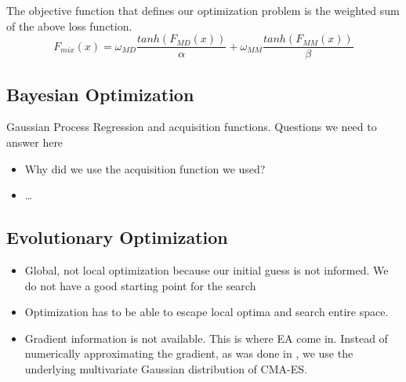 \documentclass[preprint,12pt]{elsarticle}
\begin{document}
The objective function that defines our optimization problem is the weighted sum of the above loss function.
\begin{equation}\label{loss_fun_single_scaled}
F_{mix}(x)=\omega_{MD} \frac{tanh(F_{MD}(x))}{\alpha} + \omega_{MM} \frac{tanh(F_{MM}(x))}{\beta}
\end{equation}
\subsection{Bayesian Optimization}
Gaussian Process Regression and acquisition functions.
Questions we need to answer here
\begin{itemize}
    \item Why did we use the acquisition function we used?
    \item \dots
\end{itemize}

\subsection{Evolutionary Optimization}

\begin{itemize}
    \item Global, not local optimization because our initial guess is not informed. We do not have a good starting point for the search
    \item Optimization has to be able to escape local optima and search entire space.
    \item Gradient information is not available. This is where EA come in. Instead of numerically approximating the gradient, as was done in , we use the underlying multivariate Gaussian distribution of CMA-ES.
\end{itemize}
\end{document}
